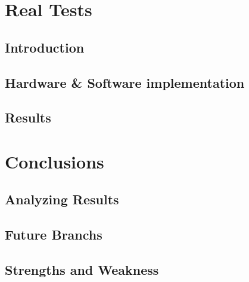 \documentclass{book} %
\begin{document}
\chapter{Real Tests}
\section{Introduction}
\section{Hardware \& Software implementation}
\section{Results}

\chapter{Conclusions} \label{chap:c6_conclusions}
\section{Analyzing Results}
\section{Future Branchs}
\section{Strengths and Weakness}

\listoffigures{}
\end{document}

